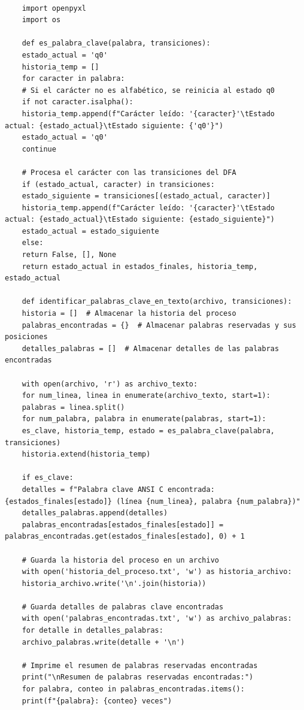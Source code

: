 \documentclass[11pt]{article} %
\begin{document}
	\begin{lstlisting}
	
	import openpyxl
	import os
	
	def es_palabra_clave(palabra, transiciones):
	estado_actual = 'q0'
	historia_temp = []
	for caracter in palabra:
	# Si el carácter no es alfabético, se reinicia al estado q0
	if not caracter.isalpha():
	historia_temp.append(f"Carácter leído: '{caracter}'\tEstado actual: {estado_actual}\tEstado siguiente: {'q0'}")
	estado_actual = 'q0'
	continue
	
	# Procesa el carácter con las transiciones del DFA
	if (estado_actual, caracter) in transiciones:
	estado_siguiente = transiciones[(estado_actual, caracter)]
	historia_temp.append(f"Carácter leído: '{caracter}'\tEstado actual: {estado_actual}\tEstado siguiente: {estado_siguiente}")
	estado_actual = estado_siguiente
	else:
	return False, [], None
	return estado_actual in estados_finales, historia_temp, estado_actual
	
	def identificar_palabras_clave_en_texto(archivo, transiciones):
	historia = []  # Almacenar la historia del proceso
	palabras_encontradas = {}  # Almacenar palabras reservadas y sus posiciones
	detalles_palabras = []  # Almacenar detalles de las palabras encontradas
	
	with open(archivo, 'r') as archivo_texto:
	for num_linea, linea in enumerate(archivo_texto, start=1):
	palabras = linea.split()
	for num_palabra, palabra in enumerate(palabras, start=1):
	es_clave, historia_temp, estado = es_palabra_clave(palabra, transiciones)
	historia.extend(historia_temp)
	
	if es_clave:
	detalles = f"Palabra clave ANSI C encontrada: {estados_finales[estado]} (línea {num_linea}, palabra {num_palabra})"
	detalles_palabras.append(detalles)
	palabras_encontradas[estados_finales[estado]] = palabras_encontradas.get(estados_finales[estado], 0) + 1
	
	# Guarda la historia del proceso en un archivo
	with open('historia_del_proceso.txt', 'w') as historia_archivo:
	historia_archivo.write('\n'.join(historia))
	
	# Guarda detalles de palabras clave encontradas
	with open('palabras_encontradas.txt', 'w') as archivo_palabras:
	for detalle in detalles_palabras:
	archivo_palabras.write(detalle + '\n')
	
	# Imprime el resumen de palabras reservadas encontradas
	print("\nResumen de palabras reservadas encontradas:")
	for palabra, conteo in palabras_encontradas.items():
	print(f"{palabra}: {conteo} veces")
	

\end{lstlisting}
\end{document}
